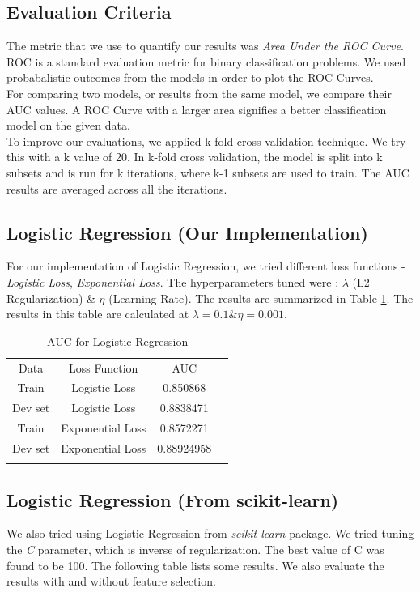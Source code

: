 \documentclass[conference]{IEEEtran}
\numberwithin{equation}{section}
\numberwithin{figure}{section}
\numberwithin{table}{section}
\begin{document}
\subsection{Evaluation Criteria}
The metric that we use to quantify our results was \textit{Area Under the ROC Curve}. ROC is a standard evaluation metric for binary classification problems. We used probabalistic outcomes from the models in order to plot the ROC Curves. \\
For comparing two models, or results from the same model, we compare their AUC values. A ROC Curve with a larger area signifies a better classification model on the given data.\\
To improve our evaluations, we applied k-fold cross validation technique. We try this with a k value of 20. In k-fold cross validation, the model is split into k subsets and is run for k iterations, where k-1 subsets are used to train. The AUC results are averaged across all the iterations.

\subsection{Logistic Regression (Our Implementation)}
For our implementation of Logistic Regression, we tried different loss functions - \textit{Logistic Loss}, \textit{Exponential Loss}. The hyperparameters tuned were : \textit{$\lambda$} (L2 Regularization) \& \textit{$\eta$} (Learning Rate). The results are summarized in Table \ref{tab_lr}. The results in this table are calculated at $\lambda = 0.1 \& \eta = 0.001$.

\begin{table}[!htb]
 \centering
 \caption{AUC for Logistic Regression}
 \label{tab_lr}
\begin{tabular}{ c c c c } 
	    \noalign{\smallskip}\hline\noalign{\smallskip}
		Data &  Loss Function & AUC \\
    	   \noalign{\smallskip}\hline\noalign{\smallskip}
		Train &  Logistic Loss & 0.850868\\
		Dev set & Logistic Loss & 0.8838471\\
		\noalign{\smallskip}\hline\noalign{\smallskip}
		Train &  Exponential Loss & 0.8572271\\
		Dev set & Exponential Loss & 0.88924958\\
		\noalign{\smallskip}\hline\noalign{\smallskip}	
  \end{tabular} 
\end{table}

\subsection{Logistic Regression (From scikit-learn)}
We also tried using Logistic Regression from \textit{scikit-learn} package. We tried tuning the \textit{C} parameter, which is inverse of 	regularization. The best value of C was found to be 100. The following table lists some results. We also evaluate the results with and without feature selection. 
\end{document}
